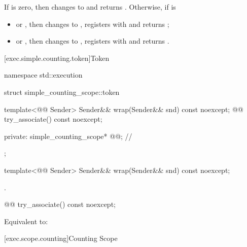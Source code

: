 \begin{itemdescr}
\pnum
\effects
If  is zero, then
changes  to  and returns .
Otherwise, if  is
\begin{itemize}
\item
{} or , then
changes  to ,
registers  with  and returns ;
\item
{} or , then
changes  to ,
registers  with  and returns .
\end{itemize}
\end{itemdescr}

[exec.simple.counting.token]{Token}

%
\begin{codeblock}
namespace std::execution {
  struct simple_counting_scope::token {
    template<@@ Sender>
      Sender&& wrap(Sender&& snd) const noexcept;
    @@ try_associate() const noexcept;

  private:
    simple_counting_scope* @@;   // \expos
  };
}
\end{codeblock}

%
\begin{itemdecl}
template<@@ Sender>
  Sender&& wrap(Sender&& snd) const noexcept;
\end{itemdecl}

\begin{itemdescr}
\pnum
\returns
{}.
\end{itemdescr}

%
\begin{itemdecl}
@@ try_associate() const noexcept;
\end{itemdecl}

\begin{itemdescr}
\pnum
\effects
Equivalent to: 
\end{itemdescr}

[exec.scope.counting]{Counting Scope}

